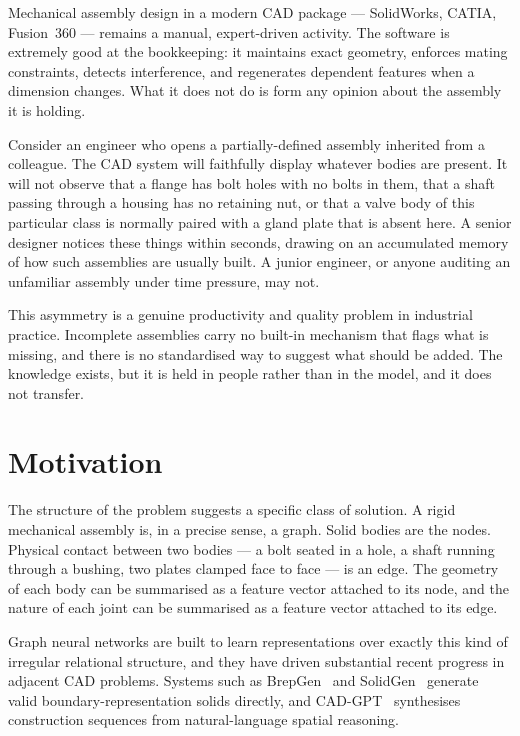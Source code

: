 \documentclass[12pt,oneside,a4paper]{report}
\begin{document}
Mechanical assembly design in a modern CAD package --- SolidWorks, CATIA,
Fusion~360 --- remains a manual, expert-driven activity. The software is
extremely good at the bookkeeping: it maintains exact geometry, enforces
mating constraints, detects interference, and regenerates dependent features
when a dimension changes. What it does not do is form any opinion about the
assembly it is holding.

Consider an engineer who opens a partially-defined assembly inherited from a
colleague. The CAD system will faithfully display whatever bodies are
present. It will not observe that a flange has bolt holes with no bolts in
them, that a shaft passing through a housing has no retaining nut, or that a
valve body of this particular class is normally paired with a gland plate
that is absent here. A senior designer notices these things within seconds,
drawing on an accumulated memory of how such assemblies are usually built. A
junior engineer, or anyone auditing an unfamiliar assembly under time
pressure, may not.

This asymmetry is a genuine productivity and quality problem in industrial
practice. Incomplete assemblies carry no built-in mechanism that flags what
is missing, and there is no standardised way to suggest what should be added.
The knowledge exists, but it is held in people rather than in the model, and
it does not transfer.

\section{Motivation}

The structure of the problem suggests a specific class of solution. A rigid
mechanical assembly is, in a precise sense, a graph. Solid bodies are the
nodes. Physical contact between two bodies --- a bolt seated in a hole, a
shaft running through a bushing, two plates clamped face to face --- is an
edge. The geometry of each body can be summarised as a feature vector
attached to its node, and the nature of each joint can be summarised as a
feature vector attached to its edge.

Graph neural networks are built to learn representations over exactly this
kind of irregular relational structure, and they have driven substantial
recent progress in adjacent CAD problems. Systems such as
BrepGen~\cite{brepgen2024} and SolidGen~\cite{solidgen2024} generate valid
boundary-representation solids directly, and CAD-GPT~\cite{cadgpt2025}
synthesises construction sequences from natural-language spatial reasoning.
\end{document}
